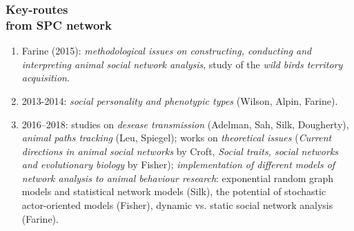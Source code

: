 \documentclass[hyperref={pdfstartview={FitBH -32768},
                         pdfpagemode=FullScreen,
                         plainpages=false,
                         colorlinks=true}
              ]{beamer}
\begin{document}
\begin{frame}[fragile]
\frametitle{Key-routes \\ \normalsize from SPC network}
\footnotesize
\begin{enumerate}
\item Farine (2015): \textit{methodological issues on constructing, conducting and interpreting animal social network analysis}, study of the \textit{wild birds territory acquisition}.
\item 2013-2014: \textit{social personality and phenotypic types} (Wilson, Alpin, Farine). 
\item 2016--2018: studies on \textit{desease transmission} (Adelman, Sah, Silk, Dougherty), \textit{animal paths tracking} (Leu, Spiegel); works on \textit{theoretical issues} (\textit{Current directions in animal social networks} by Croft, \textit{Social traits, social networks and evolutionary biology} by Fisher); \textit{implementation of different models of network analysis to animal behaviour research}:  exponential random graph models and statistical network models (Silk), the potential of stochastic actor-oriented models (Fisher),  dynamic vs. static social network analysis (Farine). \medskip   
\end{enumerate}
\end{frame}

\end{document}
